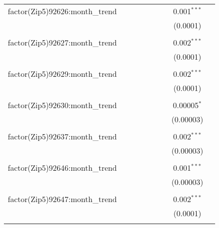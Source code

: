 \begin{table}[H]
{\begin{tabular}{@{\extracolsep{5pt}}lcccccccc}
  factor(Zip5)92626:month\_trend &  &  &  &  &  &  & 0.001$^{***}$ &  \\  

   &  &  &  &  &  &  & (0.0001) &  \\  

   & & & & & & & & \\  

  factor(Zip5)92627:month\_trend &  &  &  &  &  &  & 0.002$^{***}$ &  \\  

   &  &  &  &  &  &  & (0.0001) &  \\  

   & & & & & & & & \\  

  factor(Zip5)92629:month\_trend &  &  &  &  &  &  & 0.002$^{***}$ &  \\  

   &  &  &  &  &  &  & (0.0001) &  \\  

   & & & & & & & & \\  

  factor(Zip5)92630:month\_trend &  &  &  &  &  &  & 0.00005$^{*}$ &  \\  

   &  &  &  &  &  &  & (0.00003) &  \\  

   & & & & & & & & \\  

  factor(Zip5)92637:month\_trend &  &  &  &  &  &  & 0.002$^{***}$ &  \\  

   &  &  &  &  &  &  & (0.00003) &  \\  

   & & & & & & & & \\  

  factor(Zip5)92646:month\_trend &  &  &  &  &  &  & 0.001$^{***}$ &  \\  

   &  &  &  &  &  &  & (0.00003) &  \\  

   & & & & & & & & \\  

  factor(Zip5)92647:month\_trend &  &  &  &  &  &  & 0.002$^{***}$ &  \\  

   &  &  &  &  &  &  & (0.0001) &  \\  

   & & & & & & & & \\  


\end{tabular}}
\end{table}
